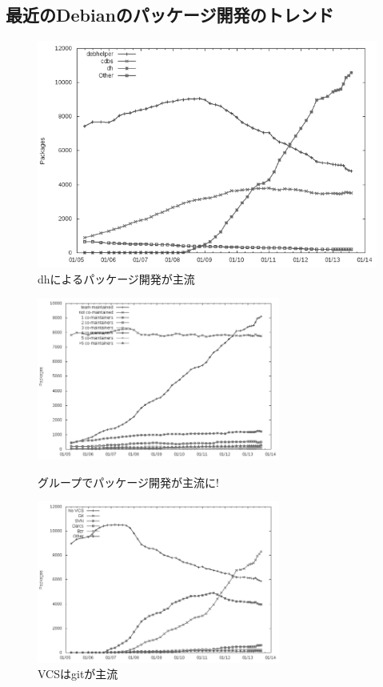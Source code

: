 \documentclass[mingoth,a4paper]{jsarticle}
\begin{document}
\subsection{最近のDebianのパッケージ開発のトレンド}
\begin{figure}[ht]
 \begin{center}
 \includegraphics[width=0.5\hsize]{image201310/debian-dev-dh_mono.png}
 \end{center}
 \caption{dhによるパッケージ開発が主流}
\end{figure}
\begin{figure}[htbp]
 \begin{minipage}{0.5\hsize}
  \begin{center}
   \includegraphics[width=80mm]{image201310/debian-dev-group_mono.png}
  \end{center}
  \caption{グループでパッケージ開発が主流に!}
 \end{minipage}
 \begin{minipage}{0.5\hsize}
  \begin{center}
   \includegraphics[width=80mm]{image201310/debian-dev-git-major_mono.png}
  \end{center}
  \caption{VCSはgitが主流}
 \end{minipage}
\end{figure}
\end{document}
